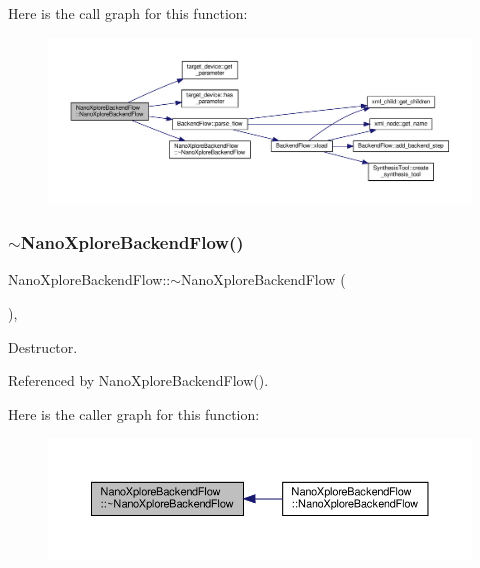 Here is the call graph for this function\+:
\nopagebreak
\begin{figure}[H]
\begin{center}
\leavevmode
\includegraphics[width=350pt]{d3/d3c/classNanoXploreBackendFlow_aa2bfcacbbdd33d2ada15f5ad8d59f99e_cgraph}
\end{center}
\end{figure}
\mbox{\label{classNanoXploreBackendFlow_aba2aa50521a65b6980f6f4544c65767c}} 
\subsubsection{\texorpdfstring{$\sim$\+Nano\+Xplore\+Backend\+Flow()}{~NanoXploreBackendFlow()}}
{\footnotesize\ttfamily Nano\+Xplore\+Backend\+Flow\+::$\sim$\+Nano\+Xplore\+Backend\+Flow (\begin{DoxyParamCaption}{ }\end{DoxyParamCaption})\hspace{0.3cm}{\ttfamily [override]}, {\ttfamily [default]}}



Destructor. 



Referenced by Nano\+Xplore\+Backend\+Flow().

Here is the caller graph for this function\+:
\nopagebreak
\begin{figure}[H]
\begin{center}
\leavevmode
\includegraphics[width=350pt]{d3/d3c/classNanoXploreBackendFlow_aba2aa50521a65b6980f6f4544c65767c_icgraph}
\end{center}
\end{figure}


